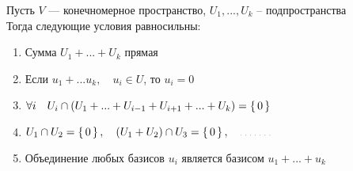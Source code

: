 \begin{theorem}
	Пусть $V$ --- конечномерное пространство, $U_1, ..., U_k $ -- подпространства \\
    Тогда следующие условия равносильны:
    \begin{enumerate}
        \item \label{it:3:1} Сумма $ U_1 + ... + U_k $ прямая
        \item \label{it:3:2} Если $ u_1 + ... u_k, \quad u_i \in U $, то $u_i = 0 $
        \item \label{it:3:3} $ \forall i \quad U_i \cap (U_1 + ... + U_{i - 1} + U_{i + 1} + ... + U_k) = \set{0} $
        \item \label{it:3:4} $ U_1 \cap U_2 = \set{0}, \quad (U_1 + U_2) \cap U_3 = \set{0}, \quad \widedots[3em] $
        \item \label{it:3:5} Объединение любых базисов $u_i$ является базисом $u_1 + ... + u_k $
    \end{enumerate}
\end{theorem}


